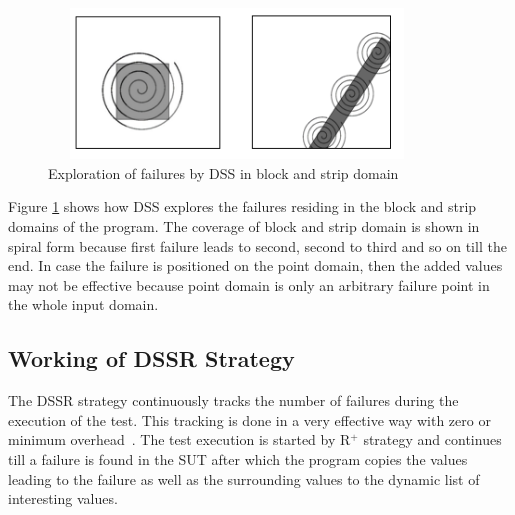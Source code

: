 \bigskip
\begin{figure}[ht]
\centering
\includegraphics[width=10cm,height=4cm]{chapter4/block2.png}
\bigskip
\caption{Exploration of failures by DSS in block and strip domain}
\label{fig:block2}
\end{figure}
\bigskip

Figure \ref{fig:block2} shows how DSS explores the failures residing in the block and strip domains of the program. The coverage of block and strip domain is shown in spiral form because first failure leads to second, second to third and so on till the end. In case the failure is positioned on the point domain, then the added values may not be effective because point domain is only an arbitrary failure point in the whole input domain.

\subsection{Working of DSSR Strategy}

The DSSR strategy continuously tracks the number of failures during the execution of the test. This tracking is done in a very effective way with zero or minimum overhead~\cite{leitner2009effectiveness}. The test execution is started by R$^+$ strategy and continues till a failure is found in the SUT after which the program copies the values leading to the failure as well as the surrounding values to the dynamic list of interesting values. 

